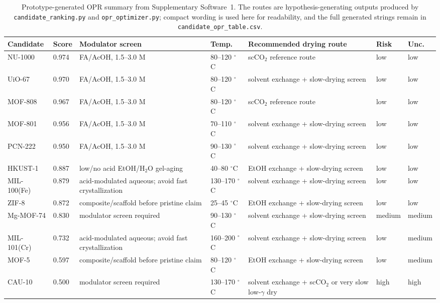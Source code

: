 \documentclass[12pt,a4paper]{article}
\begin{document}
\begin{table}[htbp]
  \centering
  \caption{Prototype-generated OPR summary from Supplementary Software~1. The routes are hypothesis-generating outputs produced by \texttt{candidate\_ranking.py} and \texttt{opr\_optimizer.py}; compact wording is used here for readability, and the full generated strings remain in \texttt{candidate\_opr\_table.csv}.}
  \label{tab:opr-summary}
  \scriptsize
  \begin{tabular}{@{}p{1.45cm}p{0.9cm}p{2.9cm}p{1.8cm}p{3.8cm}p{1.1cm}p{1.1cm}@{}}
    \toprule
    Candidate & Score & Modulator screen & Temp. & Recommended drying route & Risk & Unc. \\
    \midrule
    NU-1000 & 0.974 & FA/AcOH, 1.5--3.0 M & 80--120 $^\circ$C & scCO$_2$ reference route & low & low \\
    UiO-67 & 0.970 & FA/AcOH, 1.5--3.0 M & 80--120 $^\circ$C & solvent exchange + slow-drying screen & low & low \\
    MOF-808 & 0.967 & FA/AcOH, 1.5--3.0 M & 80--120 $^\circ$C & scCO$_2$ reference route & low & low \\
    MOF-801 & 0.956 & FA/AcOH, 1.5--3.0 M & 70--110 $^\circ$C & solvent exchange + slow-drying screen & low & low \\
    PCN-222 & 0.950 & FA/AcOH, 1.5--3.0 M & 90--130 $^\circ$C & solvent exchange + slow-drying screen & low & low \\
    HKUST-1 & 0.887 & low/no acid EtOH/H$_2$O gel-aging & 40--80 $^\circ$C & EtOH exchange + slow-drying screen & low & low \\
    MIL-100(Fe) & 0.879 & acid-modulated aqueous; avoid fast crystallization & 130--170 $^\circ$C & solvent exchange + slow-drying screen & low & low \\
    ZIF-8 & 0.872 & composite/scaffold before pristine claim & 25--45 $^\circ$C & EtOH exchange + slow-drying screen & low & low \\
    Mg-MOF-74 & 0.830 & modulator screen required & 90--130 $^\circ$C & solvent exchange + slow-drying screen & medium & medium \\
    MIL-101(Cr) & 0.732 & acid-modulated aqueous; avoid fast crystallization & 160--200 $^\circ$C & solvent exchange + slow-drying screen & low & medium \\
    MOF-5 & 0.597 & composite/scaffold before pristine claim & 80--120 $^\circ$C & EtOH exchange + slow-drying screen & low & medium \\
    CAU-10 & 0.500 & modulator screen required & 130--170 $^\circ$C & solvent exchange + scCO$_2$ or very slow low-$\gamma$ dry & high & high \\
    \bottomrule
  \end{tabular}
\end{table}
\end{document}
